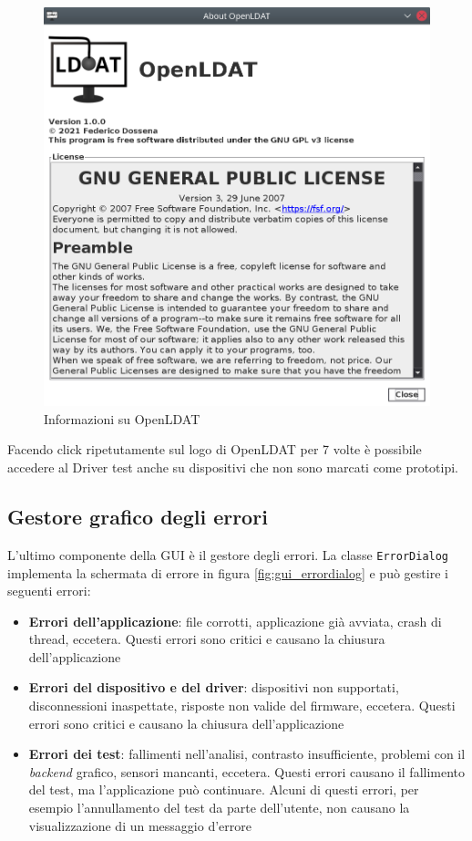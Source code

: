 \begin{figure}[H]
	\centering
	\includegraphics[width=.8\textwidth]{Applicazione_files/gui_about.png}
	\caption{Informazioni su OpenLDAT}
	\label{fig:gui_about}
\end{figure}

Facendo click ripetutamente sul logo di OpenLDAT per 7 volte è possibile accedere al Driver test anche su dispositivi che non sono marcati come prototipi.

\subsection{Gestore grafico degli errori}
L'ultimo componente della GUI è il gestore degli errori. La classe \texttt{ErrorDialog} implementa la schermata di errore in figura \ref{fig:gui_errordialog} e può gestire i seguenti errori:\begin{itemize}
	\item \textbf{Errori dell'applicazione}: file corrotti, applicazione già avviata, crash di thread, eccetera. Questi errori sono critici e causano la chiusura dell'applicazione
	\item \textbf{Errori del dispositivo e del driver}: dispositivi non supportati, disconnessioni inaspettate, risposte non valide del firmware, eccetera. Questi errori sono critici e causano la chiusura dell'applicazione
	\item \textbf{Errori dei test}: fallimenti nell'analisi, contrasto insufficiente, problemi con il \textit{backend} grafico, sensori mancanti, eccetera. Questi errori causano il fallimento del test, ma l'applicazione può continuare. Alcuni di questi errori, per esempio l'annullamento del test da parte dell'utente, non causano la visualizzazione di un messaggio d'errore
\end{itemize}

